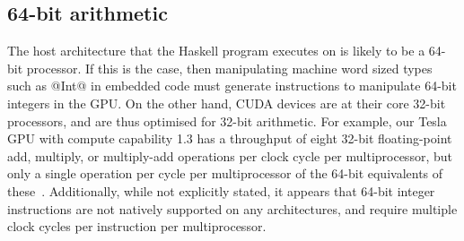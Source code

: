 %


\subsection{64-bit arithmetic}

The host architecture that the Haskell program executes on is likely to be a
64-bit processor. If this is the case, then manipulating machine word sized
types such as @Int@ in embedded code must generate instructions to manipulate
64-bit integers in the GPU\@. On the other hand, CUDA devices are at their core
32-bit processors, and are thus optimised for 32-bit arithmetic. For example, our
Tesla GPU with compute capability 1.3 has a throughput of eight 32-bit
floating-point add, multiply, or multiply-add operations per clock cycle per
multiprocessor, but only a single operation per cycle per multiprocessor of the
64-bit equivalents of these~\cite{NVIDIA:2012wf}. %
Additionally, while not explicitly stated, it appears that 64-bit integer
instructions are not natively supported on any architectures, and require
multiple clock cycles per instruction per multiprocessor.

